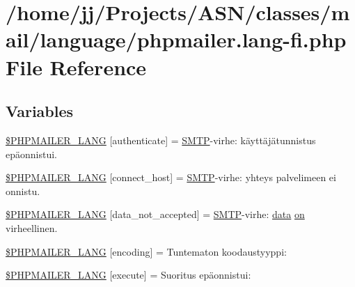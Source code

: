 \hypertarget{phpmailer_8lang-fi_8php}{}\section{/home/jj/\+Projects/\+A\+S\+N/classes/mail/language/phpmailer.lang-\/fi.php File Reference}
\label{phpmailer_8lang-fi_8php}
\subsection*{Variables}
\begin{DoxyCompactItemize}
\item 
\hyperlink{phpmailer_8lang-fi_8php_a2cb33073c989b85580748e331ed8b4aa}{\$\+P\+H\+P\+M\+A\+I\+L\+E\+R\+\_\+\+L\+A\+NG} \mbox{[}\textquotesingle{}authenticate\textquotesingle{}\mbox{]} = \textquotesingle{}\hyperlink{class_s_m_t_p}{S\+M\+TP}-\/virhe\+: käyttäjätunnistus epäonnistui.\textquotesingle{}
\item 
\hyperlink{phpmailer_8lang-fi_8php_a2ee0cc637a06b96e45600db31c6799ee}{\$\+P\+H\+P\+M\+A\+I\+L\+E\+R\+\_\+\+L\+A\+NG} \mbox{[}\textquotesingle{}connect\+\_\+host\textquotesingle{}\mbox{]} = \textquotesingle{}\hyperlink{class_s_m_t_p}{S\+M\+TP}-\/virhe\+: yhteys palvelimeen ei onnistu.\textquotesingle{}
\item 
\hyperlink{phpmailer_8lang-fi_8php_a814c6b191205d2361b3233e9c9d6fda5}{\$\+P\+H\+P\+M\+A\+I\+L\+E\+R\+\_\+\+L\+A\+NG} \mbox{[}\textquotesingle{}data\+\_\+not\+\_\+accepted\textquotesingle{}\mbox{]} = \textquotesingle{}\hyperlink{class_s_m_t_p}{S\+M\+TP}-\/virhe\+: \hyperlink{components_2_ossn_comments_2actions_2comment_2edit_8php_a2b67189b42ab547221cb2a6408f4746a}{data} \hyperlink{fullpage_2plugin_8min_8js_a0258429d15d28b8440a6c44b3a15f390}{on} virheellinen.\textquotesingle{}
\item 
\hyperlink{phpmailer_8lang-fi_8php_a817f7283f3d54c970a0c10305cc668cc}{\$\+P\+H\+P\+M\+A\+I\+L\+E\+R\+\_\+\+L\+A\+NG} \mbox{[}\textquotesingle{}encoding\textquotesingle{}\mbox{]} = \textquotesingle{}Tuntematon koodaustyyppi\+: \textquotesingle{}
\item 
\hyperlink{phpmailer_8lang-fi_8php_a668217a9563a168f30f2a8548b6ed5a9}{\$\+P\+H\+P\+M\+A\+I\+L\+E\+R\+\_\+\+L\+A\+NG} \mbox{[}\textquotesingle{}execute\textquotesingle{}\mbox{]} = \textquotesingle{}Suoritus epäonnistui\+: \textquotesingle{}
\item 

\end{DoxyCompactItemize}
